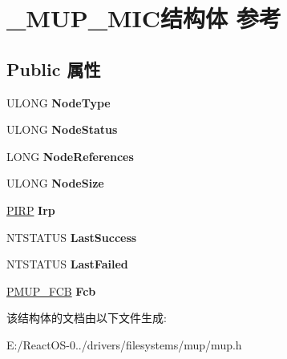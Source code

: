 \hypertarget{struct___m_u_p___m_i_c}{}\section{\+\_\+\+M\+U\+P\+\_\+\+M\+I\+C结构体 参考}
\label{struct___m_u_p___m_i_c}
\subsection*{Public 属性}
\begin{DoxyCompactItemize}
\item 
\mbox{\label{struct___m_u_p___m_i_c_ab884428995a4418eaa19ade3fda5871c}} 
U\+L\+O\+NG {\bfseries Node\+Type}
\item 
\mbox{\label{struct___m_u_p___m_i_c_a78ee8ba973de0065e5e87a96d6846021}} 
U\+L\+O\+NG {\bfseries Node\+Status}
\item 
\mbox{\label{struct___m_u_p___m_i_c_a34ba0e1028cb83adc2bf49fbe4ce2934}} 
L\+O\+NG {\bfseries Node\+References}
\item 
\mbox{\label{struct___m_u_p___m_i_c_a03c6046cd625e8a816fc391ca5d3f61d}} 
U\+L\+O\+NG {\bfseries Node\+Size}
\item 
\mbox{\label{struct___m_u_p___m_i_c_a7958bb6f5c768ba0e0ee27533b73b2b1}} 
\hyperlink{interfacevoid}{P\+I\+RP} {\bfseries Irp}
\item 
\mbox{\label{struct___m_u_p___m_i_c_acc0a3d0d680a1c3088a1766487ccac15}} 
N\+T\+S\+T\+A\+T\+US {\bfseries Last\+Success}
\item 
\mbox{\label{struct___m_u_p___m_i_c_abd6ead53ca103f038f080cbe0fbdfa74}} 
N\+T\+S\+T\+A\+T\+US {\bfseries Last\+Failed}
\item 
\mbox{\label{struct___m_u_p___m_i_c_a7ecd697a646779d9ff22224a2def212f}} 
\hyperlink{struct___m_u_p___f_c_b}{P\+M\+U\+P\+\_\+\+F\+CB} {\bfseries Fcb}
\end{DoxyCompactItemize}


该结构体的文档由以下文件生成\+:\begin{DoxyCompactItemize}
\item 
E\+:/\+React\+O\+S-\/0../drivers/filesystems/mup/mup.\+h\end{DoxyCompactItemize}
